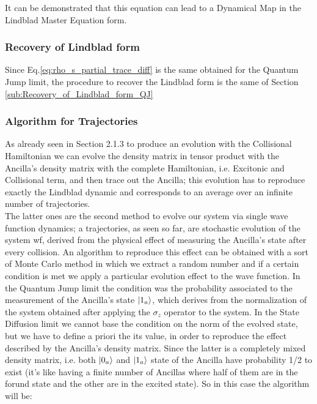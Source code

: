 \documentclass[a4paper,12pt]{article}
\begin{document}
	\begin{flushleft}
		It can be demonstrated that this equation can lead to a Dynamical Map in the Lindblad Master Equation form.
	\end{flushleft}

	\subsubsection{Recovery of Lindblad form}
	\label{sub:Recovery_of_Lindblad_form_Diff}

	Since Eq.\ref{eq:rho_s_partial_trace_diff} is the same obtained for the Quantum Jump limit, the procedure to recover the Lindblad form is the same of Section \ref{sub:Recovery_of_Lindblad_form_QJ}

	\subsubsection{Algorithm for Trajectories}
	\label{sub:alg_for_traj_diff}

	As already seen in Section 2.1.3 to produce an evolution with the Collisional Hamiltonian we can evolve the density matrix in tensor product with the Ancilla's density matrix with the complete Hamiltonian, i.e. Excitonic and Collisional term, and then trace out the Ancilla; this evolution has to reproduce exactly the Lindblad dynamic and corresponds to an average over an infinite number of trajectories. \\
	The latter ones are the second method to evolve our system via single wave function dynamics; a trajectories, as seen so far, are stochastic evolution of the system wf, derived from the physical effect of measuring the Ancilla's state after every collision. An algorithm to reproduce this effect can be obtained with a sort of Monte Carlo method in which we extract a random number and if a certain condition is met we apply a particular evolution effect to the wave function. In the Quantum Jump limit the condition was the probability associated to the measurement of the Ancilla's state $ \ket{1_a} $, which derives from the normalization of the system obtained after applying the $ \sigma_z $ operator to the system. In the State Diffusion limit we cannot base the condition on the norm of the evolved state, but we have to define a priori the its value, in order to reproduce the effect described by the Ancilla's density matrix. Since the latter is a completely mixed density matrix, i.e. both $ \ket{0_a} $ and $ \ket{1_a} $ state of the Ancilla have probability 1/2 to exist (it's like having a finite number of Ancillas where half of them are in the forund state and the other are in the excited state). So in this case the algorithm will be:
\end{document}
